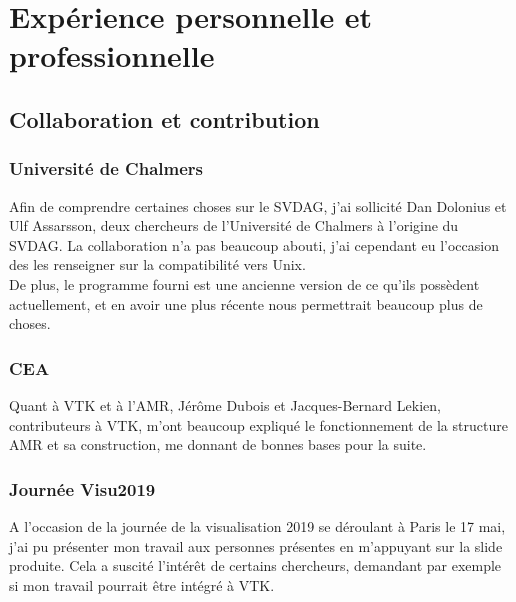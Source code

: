 \documentclass[12pt,a4paper,twoside]{article}
\begin{document}
    \begin{figure}[H]
    \end{figure}

    \section{Expérience personnelle et professionnelle}
    \subsection{Collaboration et contribution}

    \subsubsection{Université de Chalmers}

    Afin de comprendre certaines choses sur le SVDAG, j'ai sollicité Dan Dolonius et Ulf Assarsson, deux chercheurs de l'Université de Chalmers à l'origine du SVDAG.
    La collaboration n'a pas beaucoup abouti, j'ai cependant eu l'occasion des les renseigner sur la compatibilité vers Unix.\\
    De plus, le programme fourni est une ancienne version de ce qu'ils possèdent actuellement, et en avoir une plus récente
    nous permettrait beaucoup plus de choses.

    \subsubsection{CEA}

    Quant à VTK et à l'AMR, Jérôme Dubois et Jacques-Bernard Lekien, contributeurs à VTK, m'ont beaucoup expliqué
    le fonctionnement de la structure AMR et sa construction, me donnant de bonnes bases pour la suite.

    \subsubsection{Journée Visu2019}

    A l'occasion de la journée de la visualisation 2019 se déroulant à Paris le 17 mai, j'ai pu présenter mon travail
    aux personnes présentes en m'appuyant sur la slide produite. Cela a suscité l'intérêt de certains chercheurs,
    demandant par exemple si mon travail pourrait être intégré à VTK.
\end{document}
